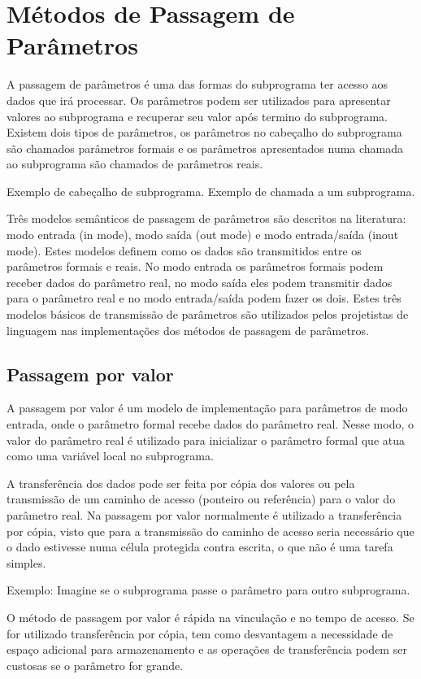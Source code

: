 \section{Métodos de Passagem de Parâmetros} %
\label{sec:metodos_passagem_parametros}
A passagem de parâmetros é uma das formas do subprograma ter acesso aos dados que irá processar. 
Os parâmetros podem ser utilizados para apresentar valores ao subprograma e recuperar seu valor após termino do subprograma. Existem dois tipos de parâmetros, os parâmetros no cabeçalho do subprograma são chamados parâmetros formais e os parâmetros apresentados numa chamada ao subprograma são chamados de parâmetros reais. 


Exemplo de cabeçalho de subprograma.
Exemplo de chamada a um subprograma.


Três modelos semânticos de passagem de parâmetros são descritos na literatura: modo entrada (in mode), modo saída (out mode) e modo entrada/saída (inout mode). Estes modelos definem como os dados são transmitidos entre os parâmetros formais e reais. No modo entrada os parâmetros formais podem receber dados do parâmetro real, no modo saída eles podem transmitir dados para o parâmetro real e no modo entrada/saída podem fazer os dois. Estes três modelos básicos de transmissão de parâmetros são utilizados pelos projetistas de linguagem nas implementações dos métodos de passagem de parâmetros.

\subsection{Passagem por valor}
A passagem por valor é um modelo de implementação para parâmetros de modo entrada, onde o parâmetro formal recebe dados do parâmetro real. Nesse modo, o valor do parâmetro real é utilizado para inicializar o parâmetro formal que atua como uma variável local no subprograma.

A transferência dos dados pode ser feita por cópia dos valores ou pela transmissão de um caminho de acesso (ponteiro ou referência) para o valor do parâmetro real. Na passagem por valor normalmente é utilizado a transferência por cópia, visto que para a transmissão do caminho de acesso seria necessário que o dado estivesse numa célula protegida contra escrita, o que não é uma tarefa simples.

Exemplo: Imagine se o subprograma passe o parâmetro para outro subprograma.

O método de passagem por valor é rápida na vinculação e no tempo de acesso. Se for utilizado transferência por cópia, tem como desvantagem a necessidade de espaço adicional para armazenamento e as operações de transferência podem ser custosas se o parâmetro for grande.


